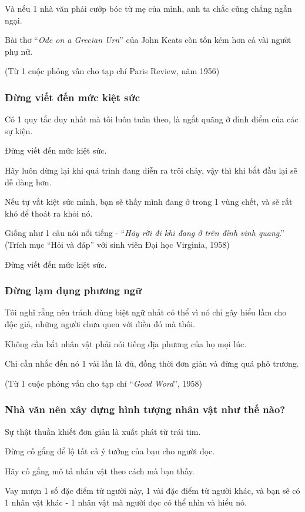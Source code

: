 \documentclass{article}
\begin{document}
Và nếu 1 nhà văn phải cướp bóc từ mẹ của mình, anh ta chắc cũng chẳng ngần ngại.

Bài thơ ``\textit{Ode on a Grecian Urn}'' của John Keats còn tốn kém hơn cả vài người phụ nữ.

(Từ 1 cuộc phỏng vấn cho tạp chí Paris Review, năm 1956)

\subsubsection{Đừng viết đến mức kiệt sức}
Có 1 quy tắc duy nhất mà tôi luôn tuân theo, là ngắt quãng ở đỉnh điểm của các sự kiện.

Đừng viết đến mức kiệt sức.

Hãy luôn dừng lại khi quá trình đang diễn ra trôi chảy, vậy thì khi bắt đầu lại sẽ dễ dàng hơn.

Nếu tự vắt kiệt sức mình, bạn sẽ thấy mình đang ở trong 1 vùng chết, và sẽ rất khó để thoát ra khỏi nó.

Giống như 1 câu nói nổi tiếng - ``\textit{Hãy rời đi khi đang ở trên đỉnh vinh quang}.'' (Trích mục ``Hỏi và đáp'' với sinh viên Đại học Virginia, 1958)

\textsf{Đừng viết đến mức kiệt sức.}

\subsubsection{Đừng lạm dụng phương ngữ}
Tôi nghĩ rằng nên tránh dùng biệt ngữ nhất có thể vì nó chỉ gây hiểu lầm cho độc giả, những người chưa quen với điều đó mà thôi.

Không cần bắt nhân vật phải nói tiếng địa phương của họ mọi lúc.

Chỉ cần nhắc đến nó 1 vài lần là đủ, đồng thời đơn giản và đừng quá phô trương.

(Từ 1 cuộc phỏng vấn cho tạp chí ``\textit{Good Word}'', 1958)

\subsubsection{Nhà văn nên xây dựng hình tượng nhân vật như thế nào?}
Sự thật thuần khiết đơn giản là xuất phát từ trái tim.

Đừng cố gắng để lộ tất cả ý tưởng của bạn cho người đọc.

Hãy cố gắng mô tả nhân vật theo cách mà bạn thấy.

Vay mượn 1 số đặc điểm từ người này, 1 vài đặc điểm từ người khác, và bạn sẽ có 1 nhân vật khác - 1 nhân vật mà người đọc có thể nhìn và hiểu nó.
\end{document}
